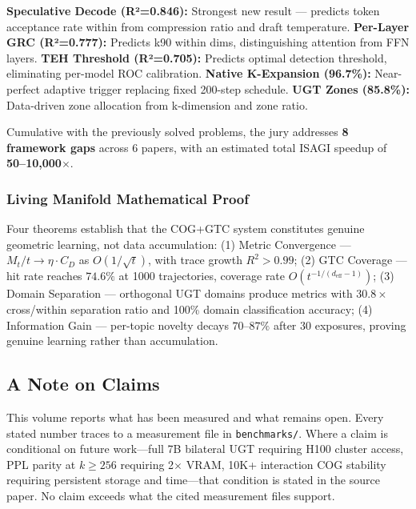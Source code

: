 \documentclass[11pt]{article}
\begin{document}
\textbf{Speculative Decode (R²=0.846):} Strongest new result — predicts token acceptance rate within  from compression ratio and draft temperature. \textbf{Per-Layer GRC (R²=0.777):} Predicts k90 within  dims, distinguishing attention from FFN layers. \textbf{TEH Threshold (R²=0.705):} Predicts optimal detection threshold, eliminating per-model ROC calibration. \textbf{Native K-Expansion (96.7\%):} Near-perfect adaptive trigger replacing fixed 200-step schedule. \textbf{UGT Zones (85.8\%):} Data-driven zone allocation from k-dimension and zone ratio.

Cumulative with the previously solved problems, the jury addresses \textbf{8 framework gaps} across 6 papers, with an estimated total ISAGI speedup of \textbf{50--10,000$\times$}.

\subsubsection*{Living Manifold Mathematical Proof}

Four theorems establish that the COG+GTC system constitutes genuine geometric learning, not data accumulation: (1) Metric Convergence --- $M_t/t \to \eta \cdot C_D$ as $O(1/\sqrt{t})$, with trace growth $R^2 > 0.99$; (2) GTC Coverage --- hit rate reaches $74.6\%$ at 1000 trajectories, coverage rate $O(t^{-1/(d_{\text{eff}}-1)})$; (3) Domain Separation --- orthogonal UGT domains produce metrics with $30.8\times$ cross/within separation ratio and 100\% domain classification accuracy; (4) Information Gain --- per-topic novelty decays $70$--$87\%$ after 30 exposures, proving genuine learning rather than accumulation.

\subsection*{A Note on Claims}

This volume reports what has been measured and what remains open. Every stated number traces to a measurement file in \texttt{benchmarks/}. Where a claim is conditional on future work---full 7B bilateral UGT requiring H100 cluster access, PPL parity at $k \ge 256$ requiring 2$\times$ VRAM, 10K+ interaction COG stability requiring persistent storage and time---that condition is stated in the source paper. No claim exceeds what the cited measurement files support.
\end{document}
